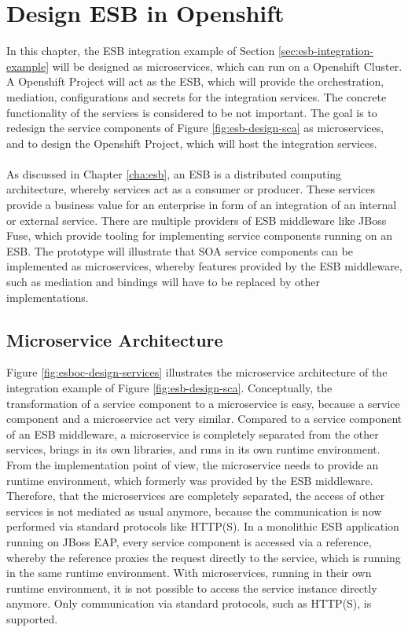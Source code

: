 \chapter{Design ESB in Openshift}
\label{cha:esboc}
In this chapter, the ESB integration example of Section \vref{sec:esb-integration-example} will be designed as microservices, which can run on a Openshift Cluster. A Openshift Project will act as the ESB, which will provide the orchestration, mediation, configurations and secrets for the integration services. The concrete functionality of the services is considered to be not important. The goal is to redesign the service components of Figure \vref{fig:esb-design-sca} as microservices, and to design the Openshift Project, which will host the integration services.
\\ \\
As discussed in Chapter \vref{cha:esb}, an ESB is a distributed computing architecture, whereby services act as a consumer or producer. These services provide a business value for an enterprise in form of an integration of an internal or external service. There are multiple providers of ESB middleware like JBoss Fuse, which provide tooling for implementing service components running on an ESB. The prototype will illustrate that SOA service components can be implemented as microservices, whereby features provided by the ESB middleware, such as mediation and bindings will have to be replaced by other implementations.

\section{Microservice Architecture}
Figure \vref{fig:esboc-design-services} illustrates the microservice architecture of the integration example of Figure \vref{fig:esb-design-sca}. Conceptually, the transformation of a service component to a microservice is easy, because a service component and a microservice act very similar. Compared to a service component of an ESB middleware, a microservice is completely separated from the other services, brings in its own libraries, and runs in its own runtime environment. From the implementation point of view, the microservice needs to provide an runtime environment, which formerly was provided by the ESB middleware. Therefore, that the microservices are completely separated, the access of other services is not mediated as usual anymore, because the communication is now performed via standard protocols like HTTP(S). In a monolithic ESB application running on JBoss EAP, every service component is accessed via a reference, whereby the reference proxies the request directly to the service, which is running in the same runtime environment. With microservices, running in their own runtime environment, it is not possible to access the service instance directly anymore. Only communication via standard protocols, such as HTTP(S), is supported.

